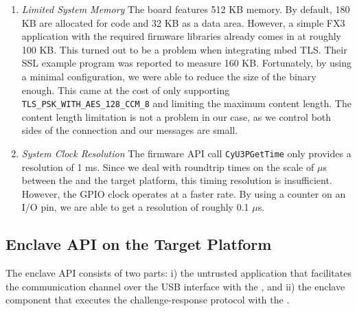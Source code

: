 \begin{enumerate}
  \item \emph{Limited System Memory} The board features 512 KB memory. By default, 180 KB are allocated for code and 32 KB as a data area. However, a simple FX3 application with the required firmware libraries already comes in at roughly 100 KB. This turned out to be a problem when integrating mbed TLS. Their SSL example program was reported to measure 160 KB. Fortunately, by using a minimal configuration, we were able to reduce the size of the binary enough. This came at the cost of only supporting \texttt{TLS\_PSK\_WITH\_AES\_128\_CCM\_8} and limiting the maximum content length. The content length limitation is not a problem in our case, as we control both sides of the connection and our messages are small.

 \item \emph{System Clock Resolution} The firmware API call \texttt{CyU3PGetTime} only provides a resolution of 1 ms. Since we deal with roundtrip times on the scale of $\mu$s between the \device and the target platform, this timing resolution is insufficient. However, the GPIO clock operates at a faster rate. By using a counter on an I/O pin, we are able to get a resolution of roughly 0.1 $\mu$s.
  
\end{enumerate}

\subsection{\name Enclave API on the Target Platform} 

The \name enclave API consists of two parts: i) the untrusted application that facilitates the communication channel over the USB interface with the \device, and ii) the enclave component that executes the challenge-response protocol with the \device.

